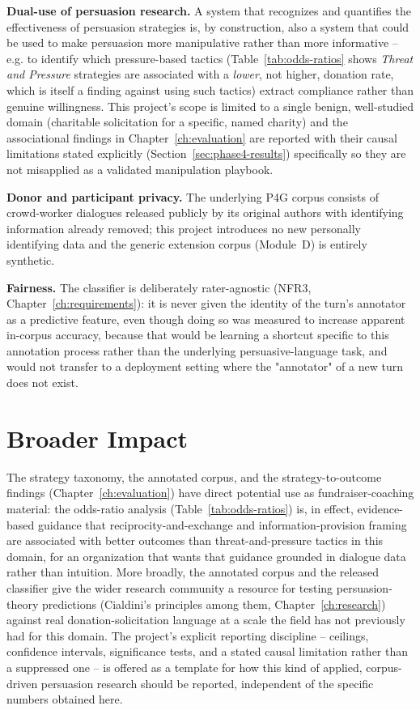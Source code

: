 \textbf{Dual-use of persuasion research.} A system that recognizes and
quantifies the effectiveness of persuasion strategies is, by construction,
also a system that could be used to make persuasion more manipulative rather
than more informative -- e.g. to identify which pressure-based tactics
(Table~\ref{tab:odds-ratios} shows \emph{Threat and Pressure} strategies are
associated with a \emph{lower}, not higher, donation rate, which is itself a
finding against using such tactics) extract compliance rather than genuine
willingness. This project's scope is limited to a single benign,
well-studied domain (charitable solicitation for a specific, named charity)
and the associational findings in Chapter~\ref{ch:evaluation} are reported
with their causal limitations stated explicitly (Section~\ref{sec:phase4-results})
specifically so they are not misapplied as a validated manipulation
playbook.

\textbf{Donor and participant privacy.} The underlying P4G corpus consists
of crowd-worker dialogues released publicly by its original authors
\citep{wang2019persuasion} with identifying information already removed;
this project introduces no new personally identifying data and the generic
extension corpus (Module~D) is entirely synthetic.

\textbf{Fairness.} The classifier is deliberately rater-agnostic
(NFR3, Chapter~\ref{ch:requirements}): it is never given the identity of the
turn's annotator as a predictive feature, even though doing so was measured
to increase apparent in-corpus accuracy, because that would be learning a
shortcut specific to this annotation process rather than the underlying
persuasive-language task, and would not transfer to a deployment setting
where the "annotator" of a new turn does not exist.

\section{Broader Impact}

The strategy taxonomy, the annotated corpus, and the strategy-to-outcome
findings (Chapter~\ref{ch:evaluation}) have direct potential use as
fundraiser-coaching material: the odds-ratio analysis
(Table~\ref{tab:odds-ratios}) is, in effect, evidence-based guidance that
reciprocity-and-exchange and information-provision framing are associated
with better outcomes than threat-and-pressure tactics in this domain, for an
organization that wants that guidance grounded in dialogue data rather than
intuition. More broadly, the annotated corpus and the released classifier
give the wider research community a resource for testing persuasion-theory
predictions (Cialdini's principles among them, Chapter~\ref{ch:research})
against real donation-solicitation language at a scale the field has not
previously had for this domain. The project's explicit reporting discipline
-- ceilings, confidence intervals, significance tests, and a stated causal
limitation rather than a suppressed one -- is offered as a template for how
this kind of applied, corpus-driven persuasion research should be reported,
independent of the specific numbers obtained here.
